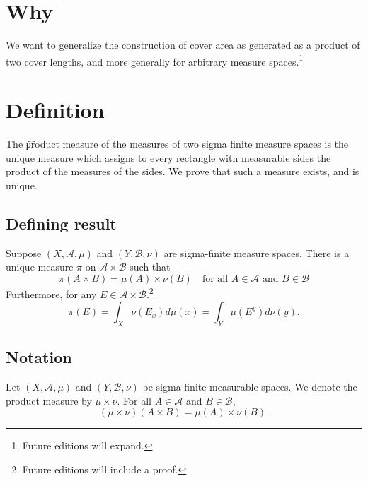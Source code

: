 
\section*{Why}

We want to generalize the construction of cover area as generated as a product of two cover lengths, and more generally for arbitrary measure spaces.\footnote{Future editions will expand.}

\section*{Definition}

The
\t{product measure}
of the measures of two
sigma finite measure spaces
is the unique measure
which assigns to every
rectangle with measurable
sides the product
of the measures of the sides.
We prove that such a measure exists,
and is unique.

\subsection*{Defining result}

\begin{proposition}
Suppose $(X, \mathcal{A} , \mu )$ and $(Y, \mathcal{B} , \nu )$ are sigma-finite measure spaces.
There is a unique measure $\pi $ on $\mathcal{A}  \times \mathcal{B} $ such that
\[
\pi (A \times  B) = \mu (A) \times  \nu (B) \quad \text{for all } A \in \mathcal{A}  \text{ and } B \in \mathcal{B}
\]
Furthermore, for any $E \in \mathcal{A}  \times  \mathcal{B} $.\footnote{Future editions will include a proof.}
\[
\pi (E) = \int _{X} \nu (E_x) d\mu (x) = \int _{Y} \mu (E^y)d\nu (y).
\]
\end{proposition}

\subsection*{Notation}

Let $(X, \mathcal{A} , \mu )$ and $(Y, \mathcal{B} , \nu )$ be sigma-finite measurable spaces.
We denote the product measure by $\mu  \times  \nu $.
For all $A \in \mathcal{A} $ and $B \in \mathcal{B} $,
\[
(\mu  \times  \nu )(A \times  B) = \mu (A) \times  \nu (B).
\]
